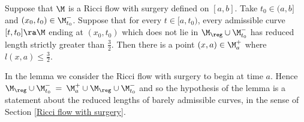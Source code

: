 \begin{lemma}
  \label{lem:kl-reduced-l-geometry-existence-reduced-length}

\label{stillleq3/2}
Suppose that $\M$ is a Ricci flow with surgery defined on $ [a,b]$.
Take
$t_0\in (a,b]$
and $(x_0,t_0)\in \M_{t_0}^-$.  Suppose that
for every $t \in [a, t_0)$, every admissible curve
$[t,t_0]\ra\M$ ending at $(x_0,t_0)$ which does not lie
in
$\M_{\reg}\cup  \M_{t_0}^-$
has reduced length strictly greater than $\frac{3}{2}$. Then
there is a point $(x,a)\in \M_a^+$ where $l(x,a)\leq \frac{3}{2}$.
\end{lemma}
\begin{remark}
  \label{rem:kl-reduced-l-geometry-structural-remark-reduced-length}

In the lemma we consider the Ricci flow with surgery to begin at time $a$.
Hence $\M_{\reg}\cup  \M_{t_0}^- \: = \: \M_a^+ \cup \M_{\reg}\cup  \M_{t_0}^-$
and so the hypothesis of the lemma is a statement about the reduced
lengths of barely admissible curves, in the sense of Section
\ref{Ricci flow with surgery}.
\end{remark}


